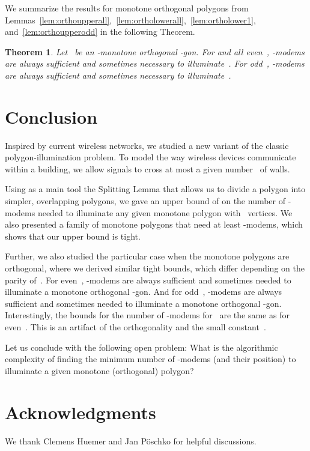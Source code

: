 \documentclass[A4]{article}
\newtheorem{theorem}{Theorem}
\begin{document}
We summarize the results for monotone orthogonal polygons from Lemmas~\ref{lem:orthoupperall},~\ref{lem:ortholowerall},~\ref{lem:ortholower1}, and~\ref{lem:orthoupperodd} in the following Theorem.


\begin{theorem}\label{thm:orthoall}
Let~ be an -monotone orthogonal -gon.
For  and all even~,  \mbox{-modems} are always sufficient and sometimes necessary to illuminate~.
For odd~,  \mbox{-modems} are always sufficient and sometimes necessary to illuminate~.
\end{theorem}





\section{Conclusion}

Inspired by current wireless networks, we studied a new variant of the classic polygon-illumination problem.
To model the way wireless devices communicate within a building, we allow signals to cross at most a given number~ of walls.

Using as a main tool the Splitting Lemma that allows us to divide a polygon into simpler, overlapping polygons, we gave an upper bound of  on the number of \mbox{-modems} needed to illuminate any given monotone polygon with~ vertices.
We also presented a family of monotone polygons that need at least  \mbox{-modems}, which shows that our upper bound is tight.


Further, we also studied the particular case when the monotone polygons are orthogonal, where we derived similar tight bounds, which differ depending on the parity of~.
For even~,  \mbox{-modems} are always sufficient and sometimes needed to illuminate a monotone orthogonal -gon.
And for odd~\mbox{},  \mbox{-modems} are always sufficient and sometimes needed to illuminate a monotone orthogonal -gon.
Interestingly, the bounds for the number of \mbox{-modems} for~ are the same as for even~.
This is an artifact of the orthogonality and the small constant~.

Let us conclude with the following open problem: 
What is the algorithmic complexity of finding the minimum number of \mbox{-modems} (and their position)
to illuminate a given monotone (orthogonal) polygon?





\section*{Acknowledgments}
We thank Clemens Huemer and Jan P{\"o}schko for helpful discussions.
\end{document}
